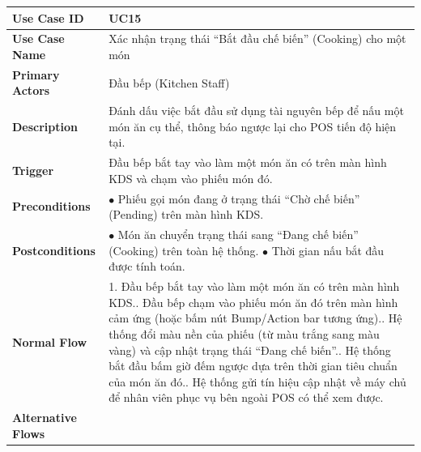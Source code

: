 \begin{longtable}{|p{3.5cm}|p{12.5cm}|}
\hline
\textbf{Use Case ID} & UC15 \\ \hline
\textbf{Use Case Name} & Xác nhận trạng thái ``Bắt đầu chế biến'' (Cooking) cho một món \\ \hline
\textbf{Primary Actors} & Đầu bếp (Kitchen Staff) \\ \hline
\textbf{Description} & Đánh dấu việc bắt đầu sử dụng tài nguyên bếp để nấu một món ăn cụ thể, thông báo ngược lại cho POS tiến độ hiện tại. \\ \hline
\textbf{Trigger} & Đầu bếp bắt tay vào làm một món ăn có trên màn hình KDS và chạm vào phiếu món đó. \\ \hline
\textbf{Preconditions} & $\bullet$ Phiếu gọi món đang ở trạng thái ``Chờ chế biến'' (Pending) trên màn hình KDS. \\ \hline
\textbf{Postconditions} &
$\bullet$ Món ăn chuyển trạng thái sang ``Đang chế biến'' (Cooking) trên toàn hệ thống.\newline
$\bullet$ Thời gian nấu bắt đầu được tính toán. \\ \hline
\textbf{Normal Flow} &
1. Đầu bếp bắt tay vào làm một món ăn có trên màn hình KDS.\newline
2. Đầu bếp chạm vào phiếu món ăn đó trên màn hình cảm ứng (hoặc bấm nút Bump/Action bar tương ứng).\newline
3. Hệ thống đổi màu nền của phiếu (từ màu trắng sang màu vàng) và cập nhật trạng thái ``Đang chế biến''.\newline
4. Hệ thống bắt đầu bấm giờ đếm ngược dựa trên thời gian tiêu chuẩn của món ăn đó.\newline
5. Hệ thống gửi tín hiệu cập nhật về máy chủ để nhân viên phục vụ bên ngoài POS có thể xem được. \\ \hline
\textbf{Alternative Flows} &
\\ \hline
\end{longtable}

